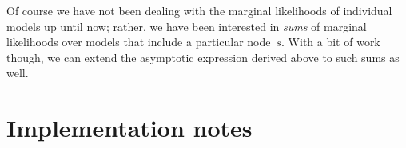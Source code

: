 \documentclass[12pt,a4paper]{article}
\begin{document}
Of course we have not been dealing with the marginal likelihoods of individual
models up until now; rather, we have been interested in \emph{sums} of marginal
likelihoods over models that include a particular node~\(s\). With a bit of work
though, we can extend the asymptotic expression derived above to such sums as
well.

\section{Implementation notes} %
\end{document}
